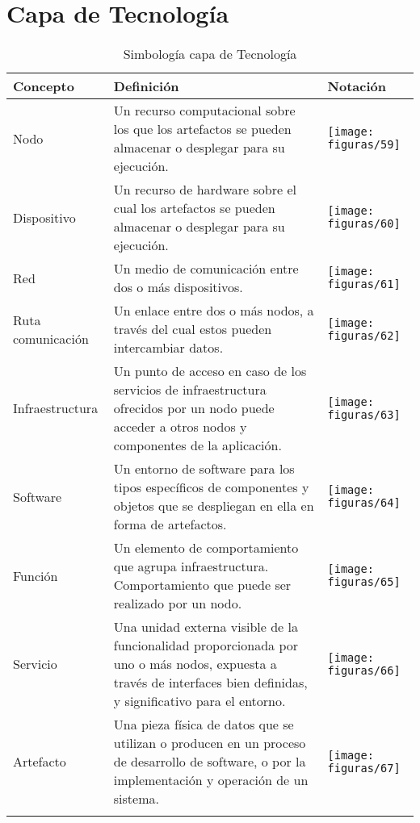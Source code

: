 \section{Capa de Tecnología}
  \begin{longtable}
  	{m{3cm}m{4.8cm}m{5.2cm}}
  	\hline
  	\rowcolor[HTML]{0073a1}
  	{\color[HTML]{FFFFFF} \textbf{Concepto}} & {\color[HTML]{FFFFFF} \textbf{Definición}} & {\color[HTML]{FFFFFF} \textbf{Notación}} \\
  	\hline
	Nodo & Un recurso computacional sobre los que los artefactos se pueden almacenar o desplegar para su ejecución. & \texttt{[image: figuras/59]} \\ \hline
	Dispositivo & Un recurso de hardware sobre el cual los artefactos se pueden almacenar o desplegar para su ejecución. & \texttt{[image: figuras/60]} \\ \hline
	Red & Un medio de comunicación entre dos o más dispositivos. & \texttt{[image: figuras/61]} \\ \hline
	Ruta comunicación & Un enlace entre dos o más nodos, a través del cual estos pueden intercambiar datos. & \texttt{[image: figuras/62]} \\ \hline
	Infraestructura & Un punto de acceso en caso de los servicios de infraestructura ofrecidos por un nodo puede acceder a otros nodos y componentes de la aplicación. & \texttt{[image: figuras/63]} \\ \hline
	Software & Un entorno de software para los tipos específicos de componentes y objetos que se despliegan en ella en forma de artefactos. & \texttt{[image: figuras/64]} \\ \hline
	Función & Un elemento de comportamiento que agrupa infraestructura. Comportamiento que puede ser realizado por un nodo. & \texttt{[image: figuras/65]} \\ \hline
	Servicio & Una unidad externa visible de la funcionalidad proporcionada por uno o más nodos, expuesta a través de interfaces bien definidas, y significativo para el entorno. & \texttt{[image: figuras/66]} \\ \hline
	Artefacto & Una pieza física de datos que se utilizan o producen en un proceso de desarrollo de software, o por la implementación y operación de un sistema. & \texttt{[image: figuras/67]} \\
	\bottomrule
	\captionsetup{width=.95\textwidth}
	\caption{Simbología capa de Tecnología}
	\label{tabla31}
  \end{longtable}
  
